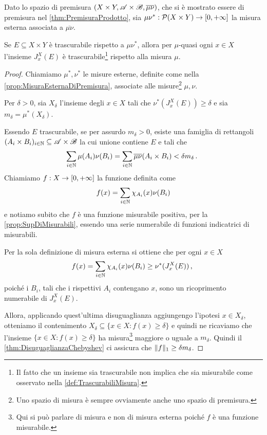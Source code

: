 \begin{proposition}\label{prop:TrascurabiliProdotto}
	Dato lo spazio di premisura $(X\times Y,\mathscr A\times\mathscr B,\overline{\mu\nu})$, che si è mostrato essere di premisura nel \cref{thm:PremisuraProdotto}, sia $\mu\nu^*:\mathcal P(X\times Y)\to[0,+\infty]$ la misura esterna associata a $\overline{\mu\nu}$.
	
	Se $E\subseteq X\times Y$ è trascurabile rispetto a $\mu\nu^*$, allora per $\mu$-quasi ogni $x\in X$ l'insieme $J_x^X(E)$ è trascurabile\footnote{Il fatto che un insieme sia trascurabile non implica che sia misurabile come osservato nella \cref{def:TrascurabiliMisura}.} rispetto alla misura $\mu$.
\end{proposition}
\begin{proof}
	Chiamiamo $\mu^*,\nu^*$ le misure esterne, definite come nella \cref{prop:MisuraEsternaDiPremisura}, associate alle misure\footnote{Uno spazio di misura è sempre ovviamente anche uno spazio di premisura.} $\mu,\nu$.
	
	Per $\delta>0$, sia $X_\delta$ l'insieme degli $x\in X$ tali che $\nu^*(J_x^X(E))\ge\delta$ e sia $m_\delta=\mu^*(X_\delta)$.
	
	Essendo $E$ trascurabile, se per assurdo $m_\delta>0$, esiste una famiglia di rettangoli $(A_i\times B_i)_{i\in\mathbb N}\subseteq \mathscr A\times\mathscr B$ la cui unione contiene $E$ e tali che
	\begin{equation*}
		\sum_{i\in\mathbb N}\mu(A_i)\nu(B_i)=\sum_{i\in\mathbb N}\overline{\mu\nu}(A_i\times B_i)< \delta m_\delta \, \text{. }
	\end{equation*}
	Chiamiamo $f:X\to[0,+\infty]$ la funzione definita come
	\begin{equation*}
		f(x)=\sum_{i\in\mathbb N}\chi_{A_i}(x)\nu(B_i)
	\end{equation*}
	e notiamo subito che $f$ è una funzione misurabile positiva, per la \cref{prop:SupDiMisurabili}, essendo una serie numerabile di funzioni indicatrici di misurabili.
	
	Per la sola definizione di misura esterna si ottiene che per ogni $x\in X$
	\begin{equation*}\label{eq:DisTrascurabiliProdotto}
		f(x)=\sum_{i\in\mathbb N}\chi_{A_i}(x)\nu(B_i)\ge\nu^*(J_x^X(E))\, \text{, }
	\end{equation*}
	poiché i $B_i$, tali che i rispettivi $A_i$ contengano $x$, sono un ricoprimento numerabile di $J_x^X(E)$.
	
	Allora, applicando quest'ultima disuguaglianza aggiungengo l'ipotesi $x\in X_\delta$, otteniamo il contenimento $X_\delta\subseteq \{x\in X:f(x)\ge\delta\}$ e quindi ne ricaviamo che l'insieme $\{x\in X:f(x)\ge\delta\}$ ha misura\footnote{Qui si può parlare di misura e non di misura esterna poiché $f$ è una funzione misurabile.} maggiore o uguale a $m_\delta$.
	Quindi il \cref{thm:DisuguaglianzaChebyshev} ci assicura che $\Vert f\Vert_1\ge \delta m_\delta$.


\end{proof}
